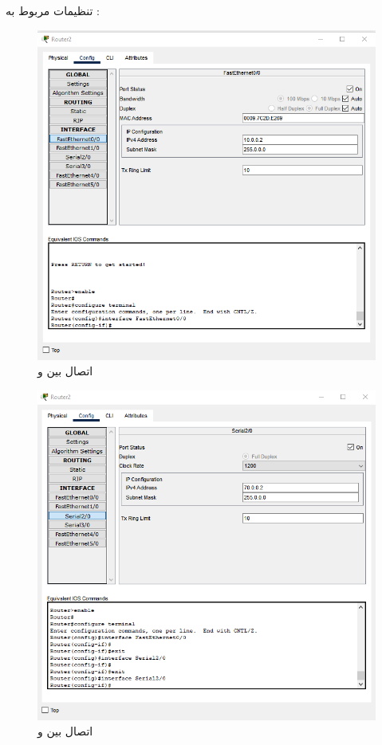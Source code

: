 \documentclass[12pt]{article}
\begin{document}
تنظیمات مربوط به :
\begin{figure}[H]
	\centering
	\includegraphics[scale=0.4]{images/rip/1.png}
	\caption{اتصال بین  و } 
	\label{r2pc0}
\end{figure}


\begin{figure}[H]
	\centering
	\includegraphics[scale=0.4]{images/rip/2.png}
	\caption{اتصال بین  و } 
	\label{r2r3}
\end{figure}
\end{document}
